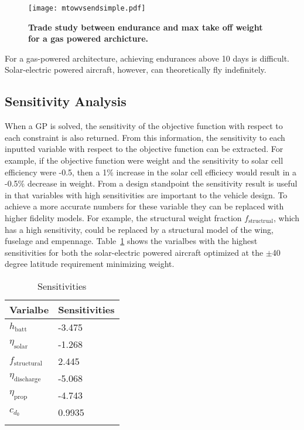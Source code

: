 \documentclass[]{aiaa-tc}%
\begin{document}
\begin{figure}[H]
	\begin{center}
	\texttt{[image: mtowvsendsimple.pdf]}
    \caption{ \textbf{ Trade study between endurance and max take off weight for a gas powered archicture. }}
	\label{f:mtowvsendsimple}
	\end{center}
\end{figure}

For a gas-powered architecture, achieving endurances above 10 days is difficult.  Solar-electric powered aircraft, however, can theoretically fly indefinitely. 

\subsection{Sensitivity Analysis}

When a GP is solved, the sensitivity of the objective function with respect to each constraint is also returned.  From this information, the sensitivity to each inputted variable with respect to the objective function can be extracted.\cite{hoburgthesis} 
For example, if the objective function were weight and the sensitivity to solar cell efficiency were -0.5, then a 1\% increase in the solar cell efficiecy would result in a -0.5\% decrease in weight.  
From a design standpoint the sensitivity result is useful in that variables with high sensitivities are important to the vehicle design. 
To achieve a more accurate numbers for these variable they can be replaced with higher fidelity models.  
For example, the structural weight fraction $f_{\text{structrual}}$, which has a high sensitivity, could be replaced by a structural model of the wing, fuselage and empennage. 
Table~\ref{t:sens} shows the varialbes with the highest sensitivities for both the solar-electric powered aircraft optimized at the $\pm$40 degree latitude requirement minimizing weight. 

\begin{longtable}{ll}
\caption{Sensitivities} \\
\toprule
\toprule
 Varialbe & Sensitivities \\
\midrule
$h_{\text{batt}}$         & -3.475 \\
$\eta_{\text{solar}}$     & -1.268 \\
$f_{\text{structural}}$   & 2.445  \\
$\eta_{\text{discharge}}$ & -5.068 \\
$\eta_{\text{prop}}$      & -4.743 \\
$c_{d_0}$                 & 0.9935 \\
\bottomrule
\label{t:sens}
 \end{longtable}
\end{document}
